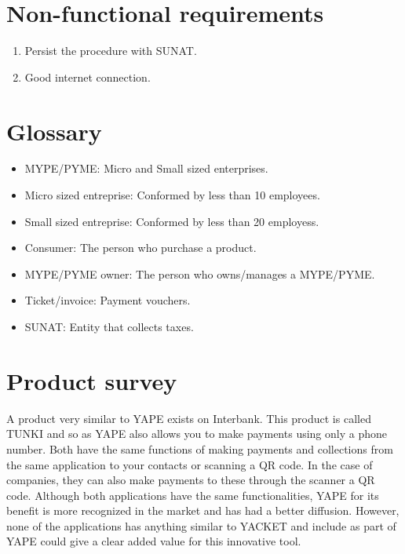 \documentclass{article}
\begin{document}
\section{Non-functional requirements}
\begin{enumerate}
     \item Persist the procedure with SUNAT.
     \item Good internet connection.
    
\end{enumerate}

\section{Glossary}

\begin{itemize}
    \item MYPE/PYME: Micro and Small sized enterprises.
    \item Micro sized entreprise: Conformed by less than 10 employees.
    \item Small sized entreprise: Conformed by less than 20 employess.
    \item Consumer: The person who purchase a product.
    \item MYPE/PYME owner: The person who owns/manages a MYPE/PYME.
    \item Ticket/invoice: Payment vouchers.
    \item SUNAT: Entity that collects taxes.
\end{itemize}


\section{Product survey}
A product very similar to YAPE exists on Interbank. This product is called TUNKI and so as YAPE also allows you to make payments using only a phone number.
Both have the same functions of making payments and collections from the
same application to your contacts or scanning a QR code. In the case of
companies, they can also make payments to these through the scanner a
QR code. Although both applications have the same functionalities,
YAPE for its benefit is more recognized in the market and has had a better
diffusion. However, none of the applications has anything similar to
YACKET and include as part of YAPE could give a clear added value
for this innovative tool.
\end{document}
